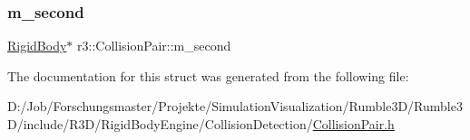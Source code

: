\mbox{\label{structr3_1_1_collision_pair_ad7ff97123502a1e0535d3f5da8013411}} 
\subsubsection{\texorpdfstring{m\+\_\+second}{m\_second}}
{\footnotesize\ttfamily \mbox{\hyperlink{classr3_1_1_rigid_body}{Rigid\+Body}}$\ast$ r3\+::\+Collision\+Pair\+::m\+\_\+second}



The documentation for this struct was generated from the following file\+:\begin{DoxyCompactItemize}
\item 
D\+:/\+Job/\+Forschungsmaster/\+Projekte/\+Simulation\+Visualization/\+Rumble3\+D/\+Rumble3\+D/include/\+R3\+D/\+Rigid\+Body\+Engine/\+Collision\+Detection/\mbox{\hyperlink{_collision_pair_8h}{Collision\+Pair.\+h}}\end{DoxyCompactItemize}
